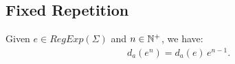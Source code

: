 \subsection{Fixed Repetition}

\begin{thm}
	\label{thm:fixed_repetition_derivative}
	Given $e \in RegExp(\Sigma)$ and $n \in {\mathbb{N}^{+}}$, we have:
	\begin{align*}
		d_a(e^n) = d_a(e)\,e^{n-1}.
	\end{align*}
\end{thm}


